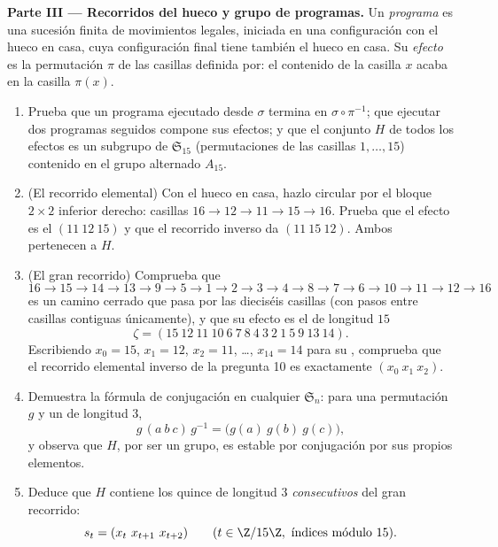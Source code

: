 \begin{problem}
\medskip
\noindent\textbf{Parte III --- Recorridos del hueco y grupo de
programas.} Un \emph{programa} es una sucesión finita de
movimientos legales, iniciada en una configuración con el hueco en
casa, cuya configuración final tiene también el hueco en casa. Su
\emph{efecto} es la permutación $\pi$ de las casillas definida
por: el contenido de la casilla $x$ acaba en la casilla $\pi(x)$.
\begin{enumerate}[resume]
  \item Prueba que un programa ejecutado desde $\sigma$ termina en
        $\sigma \circ \pi^{-1}$; que ejecutar dos programas
        seguidos compone sus efectos; y que el conjunto $H$ de
        todos los efectos es un subgrupo de $\mathfrak{S}_{15}$
        (permutaciones de las casillas $1, \dots, 15$) contenido
        en el grupo alternado $A_{15}$.
  \item (El recorrido elemental) Con el hueco en casa, hazlo
        circular por el bloque $2 \times 2$ inferior derecho:
        casillas $16 \to 12 \to 11 \to 15 \to 16$. Prueba que el
        efecto es el  $(11\ 12\ 15)$ y que el recorrido
        inverso da $(11\ 15\ 12)$. Ambos pertenecen a $H$.
  \item (El gran recorrido) Comprueba que
        \[
        16 \to 15 \to 14 \to 13 \to 9 \to 5 \to 1 \to 2 \to 3
        \to 4 \to 8 \to 7 \to 6 \to 10 \to 11 \to 12 \to 16
        \]
        es un camino cerrado que pasa por las dieciséis casillas
        (con pasos entre casillas contiguas únicamente), y que su
        efecto es el  de longitud $15$
        \[
        \zeta = (15\ 12\ 11\ 10\ 6\ 7\ 8\ 4\ 3\ 2\ 1\ 5\ 9\ 13\
        14) .
        \]
        Escribiendo $x_0 = 15$, $x_1 = 12$, $x_2 = 11$, \dots,
        $x_{14} = 14$ para su  , comprueba que el
        recorrido elemental inverso de la pregunta 10 es
        exactamente $(x_0\ x_1\ x_2)$.
  \item Demuestra la fórmula de conjugación en cualquier
        $\mathfrak{S}_n$: para una permutación $g$ y un  de
        longitud $3$,
        \[
        g\,(a\ b\ c)\,g^{-1} = \bigl(g(a)\ g(b)\ g(c)\bigr),
        \]
        y observa que $H$, por ser un grupo, es estable por
        conjugación por sus propios elementos.
  \item Deduce que $H$ contiene los quince  de longitud $3$
        \emph{consecutivos} del gran recorrido:
        \[
        s_t = (x_t\ x_{t+1}\ x_{t+2}) \qquad (t \in \Z/15\Z,
        \text{ índices módulo } 15).
        \]
\end{enumerate}


\end{problem}

